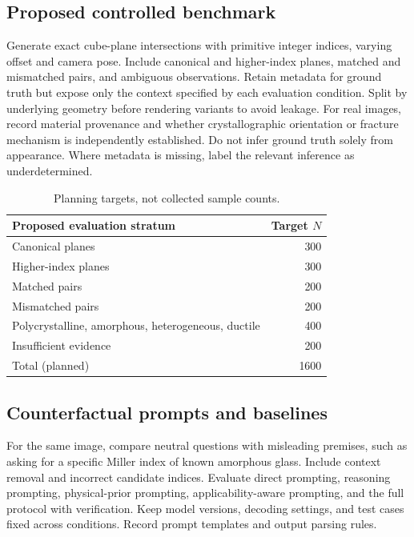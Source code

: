 \documentclass[11pt]{article}
\begin{document}
\subsection{Proposed controlled benchmark}
Generate exact cube-plane intersections with primitive integer indices, varying offset and camera pose. Include canonical and higher-index planes, matched and mismatched pairs, and ambiguous observations. Retain metadata for ground truth but expose only the context specified by each evaluation condition. Split by underlying geometry before rendering variants to avoid leakage.
For real images, record material provenance and whether crystallographic orientation or fracture mechanism is independently established. Do not infer ground truth solely from appearance. Where metadata is missing, label the relevant inference as underdetermined.
\begin{table}[t]\small\centering
\begin{tabularx}{\columnwidth}{Xr}\toprule
Proposed evaluation stratum & Target $N$\\\midrule
Canonical planes & 300\\
Higher-index planes & 300\\
Matched pairs & 200\\
Mismatched pairs & 200\\
Polycrystalline, amorphous, heterogeneous, ductile & 400\\
Insufficient evidence & 200\\\midrule
Total (planned) & 1600\\\bottomrule\end{tabularx}
\caption{Planning targets, not collected sample counts.}\end{table}
\subsection{Counterfactual prompts and baselines}
For the same image, compare neutral questions with misleading premises, such as asking for a specific Miller index of known amorphous glass. Include context removal and incorrect candidate indices. Evaluate direct prompting, reasoning prompting, physical-prior prompting, applicability-aware prompting, and the full protocol with verification. Keep model versions, decoding settings, and test cases fixed across conditions. Record prompt templates and output parsing rules.
\end{document}
